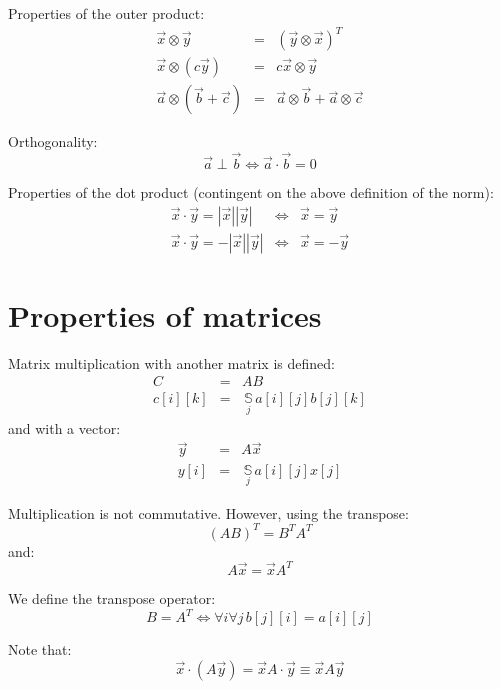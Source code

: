 \documentclass{article}
\newcommand{\inner}{\cdot}
\renewcommand{\outer}{\otimes}
\newcommand{\summation}[1]{\underset{#1}{\,\mathbb{S}\,}}
\begin{document}
Properties of the outer product:
\begin{eqnarray}
	\vec x \outer \vec y & = & (\vec y \outer \vec x)^T \\
	\vec x \outer (c \vec y) & = & c \vec x \outer \vec y \\
	\vec a \outer (\vec b + \vec c) & = & \vec a \outer \vec b + \vec a \outer \vec c
\end{eqnarray}

Orthogonality:
\begin{equation}
	\vec a \perp \vec b \iff \vec a \inner \vec b = 0
\end{equation}

Properties of the dot product (contingent on the above definition of the norm):
\begin{eqnarray}
	\vec x \inner \vec y = | \vec x | | \vec y | & \iff & \vec x = \vec y \\
	\vec x \inner \vec y = - | \vec x | | \vec y | & \iff & \vec x = - \vec y 
\end{eqnarray}

\section{Properties of matrices}

Matrix multiplication with another matrix is defined:
\begin{eqnarray}
	C & = & A B \\
	c[i][k] & = & \summation{j} a[i][j] b[j][k]
\end{eqnarray}
and with a vector:
\begin{eqnarray}
	\vec y & = & A \vec x \\
	y[i] & = & \summation{j} a[i][j] x[j]
\end{eqnarray}

Multiplication is not commutative.
However, using the transpose:
\begin{equation}
	(AB)^T = B^T A^T
\end{equation}
and:
\begin{equation}
	A \vec x = \vec x A^T
\end{equation}

We define the transpose operator:
\begin{equation}
	B = A^T \iff \forall i \forall j \, b[j][i] = a[i][j]
\end{equation}

Note that:
\begin{equation}
	\vec x \inner (A \vec y) = \vec x A \inner \vec y \equiv \vec x A \vec y
\end{equation}
\end{document}
